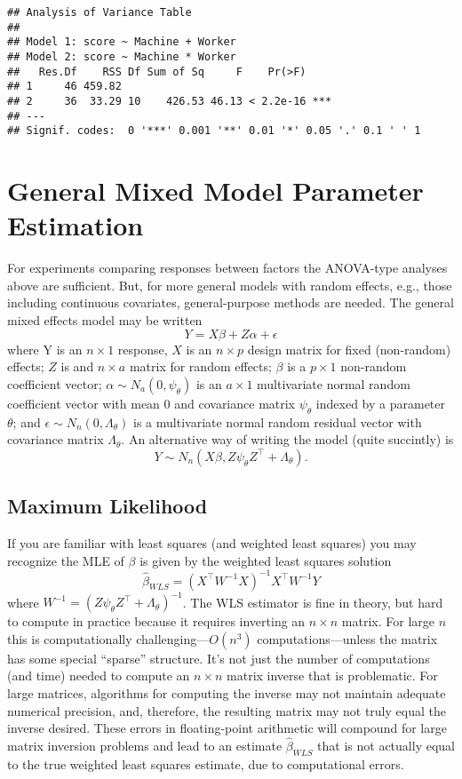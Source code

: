 \documentclass[
]{book}
\begin{document}
\begin{verbatim}
## Analysis of Variance Table
## 
## Model 1: score ~ Machine + Worker
## Model 2: score ~ Machine * Worker
##   Res.Df    RSS Df Sum of Sq     F    Pr(>F)    
## 1     46 459.82                                 
## 2     36  33.29 10    426.53 46.13 < 2.2e-16 ***
## ---
## Signif. codes:  0 '***' 0.001 '**' 0.01 '*' 0.05 '.' 0.1 ' ' 1
\end{verbatim}

\hypertarget{general-mixed-model-parameter-estimation}{%
\section{General Mixed Model Parameter Estimation}\label{general-mixed-model-parameter-estimation}}

For experiments comparing responses between factors the ANOVA-type analyses above are sufficient. But, for more general models with random effects, e.g., those including continuous covariates, general-purpose methods are needed. The general mixed effects model may be written
\[Y = X\beta+ Z\alpha + \epsilon\]
where Y is an \(n\times 1\) response, \(X\) is an \(n \times p\) design matrix for fixed (non-random) effects; \(Z\) is and \(n\times a\) matrix for random effects; \(\beta\) is a \(p\times 1\) non-random coefficient vector; \(\alpha\sim N_a(0, \psi_\theta)\) is an \(a\times 1\) multivariate normal random coefficient vector with mean 0 and covariance matrix \(\psi_\theta\) indexed by a parameter \(\theta\); and \(\epsilon\sim N_n(0, \Lambda_\theta)\) is a multivariate normal random residual vector with covariance matrix \(\Lambda_\theta\). An alternative way of writing the model (quite succintly) is
\[Y\sim N_n(X\beta, Z \psi_\theta Z^\top + \Lambda_\theta).\]

\hypertarget{maximum-likelihood}{%
\subsection{Maximum Likelihood}\label{maximum-likelihood}}

If you are familiar with least squares (and weighted least squares) you may recognize the MLE of \(\beta\) is given by the weighted least squares solution
\[\hat\beta_{WLS} = (X^\top W^{-1}X)^{-1}X^\top W^{-1}Y\]
where \(W^{-1} = (Z \psi_\theta Z^\top + \Lambda_\theta)^{-1}\). The WLS estimator is fine in theory, but hard to compute in practice because it requires inverting an \(n\times n\) matrix. For large \(n\) this is computationally challenging---\(O(n^3)\) computations---unless the matrix has some special ``sparse'' structure. It's not just the number of computations (and time) needed to compute an \(n\times n\) matrix inverse that is problematic. For large matrices, algorithms for computing the inverse may not maintain adequate numerical precision, and, therefore, the resulting matrix may not truly equal the inverse desired. These errors in floating-point arithmetic will compound for large matrix inversion problems and lead to an estimate \(\hat\beta_{WLS}\) that is not actually equal to the true weighted least squares estimate, due to computational errors.
\end{document}

